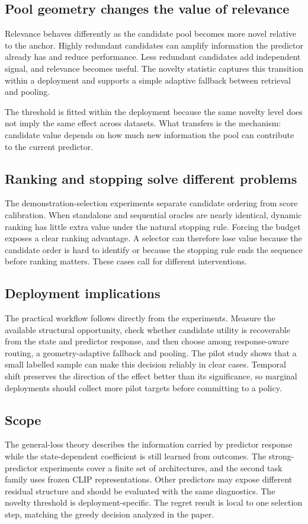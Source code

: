 \subsection{Pool geometry changes the value of relevance}

Relevance behaves differently as the candidate pool becomes more novel relative
to the anchor. Highly redundant candidates can amplify information the predictor
already has and reduce performance. Less redundant candidates add independent
signal, and relevance becomes useful. The novelty statistic captures this
transition within a deployment and supports a simple adaptive fallback between
retrieval and pooling.

The threshold is fitted within the deployment because the same novelty level
does not imply the same effect across datasets. What transfers is the mechanism:
candidate value depends on how much new information the pool can contribute to
the current predictor.

\subsection{Ranking and stopping solve different problems}

The demonstration-selection experiments separate candidate ordering from score
calibration. When standalone and sequential oracles are nearly identical,
dynamic ranking has little extra value under the natural stopping rule. Forcing
the budget exposes a clear ranking advantage. A selector can therefore lose
value because the candidate order is hard to identify or because the stopping
rule ends the sequence before ranking matters. These cases call for different
interventions.

\subsection{Deployment implications}

The practical workflow follows directly from the experiments. Measure the
available structural opportunity, check whether candidate utility is recoverable
from the state and predictor response, and then choose among response-aware
routing, a geometry-adaptive fallback and pooling. The pilot study shows that a
small labelled sample can make this decision reliably in clear cases. Temporal
shift preserves the direction of the effect better than its significance, so
marginal deployments should collect more pilot targets before committing to a
policy.

\subsection{Scope}

The general-loss theory describes the information carried by predictor response
while the state-dependent coefficient is still learned from outcomes. The
strong-predictor experiments cover a finite set of architectures, and the
second task family uses frozen CLIP representations. Other predictors may expose
different residual structure and should be evaluated with the same diagnostics.
The novelty threshold is deployment-specific. The regret result is local to one
selection step, matching the greedy decision analyzed in the paper.
